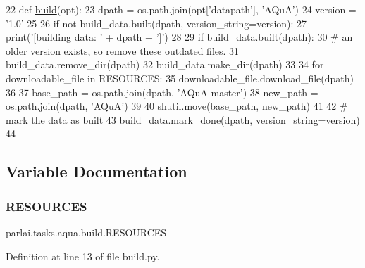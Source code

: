 \begin{DoxyCode}
22 \textcolor{keyword}{def }\hyperlink{namespacedialog__babi__feedback_1_1build_a7a9d289f7493a5ded13c4b7f071b6184}{build}(opt):
23     dpath = os.path.join(opt[\textcolor{stringliteral}{'datapath'}], \textcolor{stringliteral}{'AQuA'})
24     version = \textcolor{stringliteral}{'1.0'}
25 
26     \textcolor{keywordflow}{if} \textcolor{keywordflow}{not} build\_data.built(dpath, version\_string=version):
27         print(\textcolor{stringliteral}{'[building data: '} + dpath + \textcolor{stringliteral}{']'})
28 
29         \textcolor{keywordflow}{if} build\_data.built(dpath):
30             \textcolor{comment}{# an older version exists, so remove these outdated files.}
31             build\_data.remove\_dir(dpath)
32         build\_data.make\_dir(dpath)
33 
34         \textcolor{keywordflow}{for} downloadable\_file \textcolor{keywordflow}{in} RESOURCES:
35             downloadable\_file.download\_file(dpath)
36 
37         base\_path = os.path.join(dpath, \textcolor{stringliteral}{'AQuA-master'})
38         new\_path = os.path.join(dpath, \textcolor{stringliteral}{'AQuA'})
39 
40         shutil.move(base\_path, new\_path)
41 
42         \textcolor{comment}{# mark the data as built}
43         build\_data.mark\_done(dpath, version\_string=version)
44 \end{DoxyCode}


\subsection{Variable Documentation}
\mbox{\label{namespaceparlai_1_1tasks_1_1aqua_1_1build_a936890e1870494761c677c9fdda3a230}} 
\subsubsection{\texorpdfstring{R\+E\+S\+O\+U\+R\+C\+ES}{RESOURCES}}
{\footnotesize\ttfamily parlai.\+tasks.\+aqua.\+build.\+R\+E\+S\+O\+U\+R\+C\+ES}



Definition at line 13 of file build.\+py.

